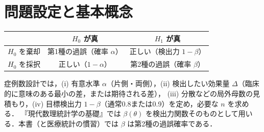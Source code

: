 \documentclass[a4paper,11pt,openany]{ltjsbook}
\newcommand{\tagbox}[2]{\tcbox[on line,boxsep=0.5pt,left=2pt,right=2pt,top=0.5pt,bottom=0.5pt,
  colframe=#1,colback=#1!10,boxrule=0.4pt,arc=1pt]{\scriptsize\bfseries\textcolor{#1}{#2}}}
\newcommand{\Youchui}{\tagbox{bkpurple}{要注意}}
\begin{document}
\section{問題設定と基本概念}\label{sec:12-basic}
\begin{center}\small
\begin{tabular}{@{}lcc@{}}
\toprule
 & $H_0$ が真 & $H_1$ が真\\
\midrule
$H_0$ を棄却 & 第1種の過誤（確率 $\alpha$） & 正しい（検出力 $1-\beta$）\\
$H_0$ を採択 & 正しい（$1-\alpha$） & 第2種の過誤（確率 $\beta$）\\
\bottomrule
\end{tabular}
\end{center}
症例数設計では，(i) 有意水準 $\alpha$（片側・両側），(ii) 検出したい効果量 $\Delta$（臨床的に意味のある最小の差，または期待される差），
(iii) 分散などの局外母数の見積もり，(iv) 目標検出力 $1-\beta$（通常0.8または0.9）を定め，必要な $n$ を求める．
\Youchui 『現代数理統計学の基礎』では $\beta(\theta)$ を検出力関数そのものとして用いる．本書（と医療統計の慣習）では $\beta$ は第2種の過誤確率である．
\end{document}

